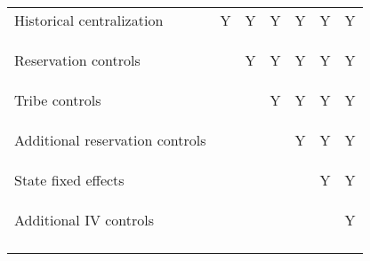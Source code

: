 \begin{center}
\begin{tabular}{lcccccc}
\noalign{\smallskip}Historical centralization & Y & Y & Y & Y & Y & Y\\
Reservation controls & \begin{footnotesize}\end{footnotesize} & \begin{footnotesize}Y\end{footnotesize} & \begin{footnotesize}Y\end{footnotesize} & \begin{footnotesize}Y\end{footnotesize} & \begin{footnotesize}Y\end{footnotesize} & \begin{footnotesize}Y\end{footnotesize}\\
Tribe controls &  &  & Y & Y & Y & Y\\
Additional reservation controls & \begin{footnotesize}\end{footnotesize} & \begin{footnotesize}\end{footnotesize} & \begin{footnotesize}\end{footnotesize} & \begin{footnotesize}Y\end{footnotesize} & \begin{footnotesize}Y\end{footnotesize} & \begin{footnotesize}Y\end{footnotesize}\\
State fixed effects &  &  &  &  & Y & Y\\
Additional IV controls & \begin{footnotesize}\end{footnotesize} & \begin{footnotesize}\end{footnotesize} & \begin{footnotesize}\end{footnotesize} & \begin{footnotesize}\end{footnotesize} & \begin{footnotesize}\end{footnotesize} & \begin{footnotesize}Y\end{footnotesize}\\
\noalign{\smallskip}\hline\end{tabular}\\
\end{center}
